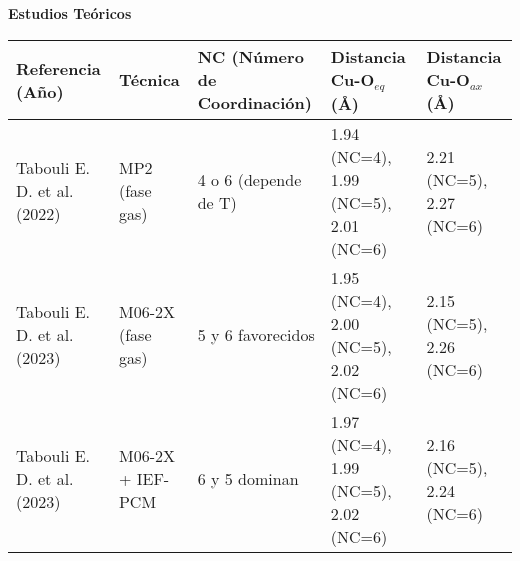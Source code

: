 \begin{sidewaystable}
{    %
    \textbf{Estudios Teóricos}
    \vspace{2mm} %

    \begin{tabular}{@{}lllll@{}}
    \toprule
    \textbf{Referencia (Año)} & \textbf{Técnica} & \textbf{NC (Número de Coordinación)} & \textbf{Distancia Cu-O$_{eq}$ (\AA)} & \textbf{Distancia Cu-O$_{ax}$ (\AA)} \\
    \midrule
    Tabouli E. D. et al. (2022) & MP2 (fase gas)          & 4 o 6 (depende de T)  & 1.94 (NC=4), 1.99 (NC=5), 2.01 (NC=6)  & 2.21 (NC=5), 2.27 (NC=6)  \\
    Tabouli E. D. et al. (2023) & M06-2X (fase gas)       & 5 y 6 favorecidos     & 1.95 (NC=4), 2.00 (NC=5), 2.02 (NC=6)  & 2.15 (NC=5), 2.26 (NC=6)  \\
    Tabouli E. D. et al. (2023) & M06-2X + IEF-PCM        & 6 y 5 dominan         & 1.97 (NC=4), 1.99 (NC=5), 2.02 (NC=6)  & 2.16 (NC=5), 2.24 (NC=6)  \\
    \bottomrule
    \end{tabular}
    
    } %
\end{sidewaystable}

